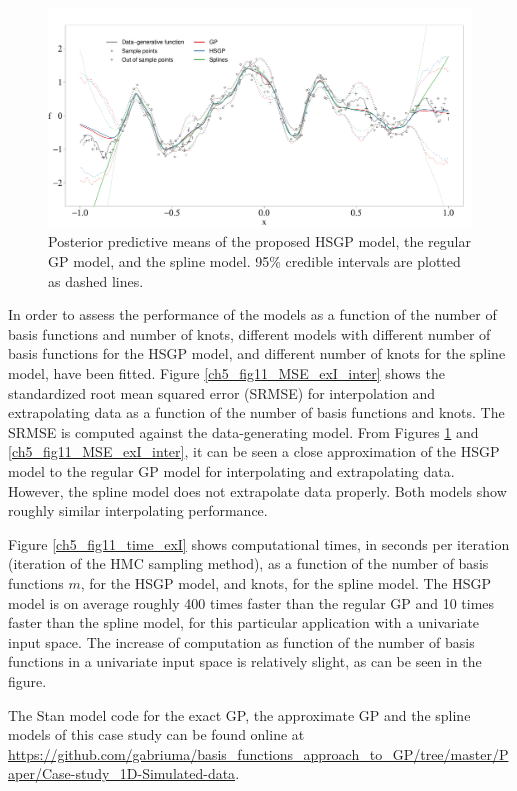 \documentclass[onecolumn,a4paper,11pt]{article}
\begin{document}
\begin{figure}
\centering
\includegraphics[width=\textwidth]{ch5_fig10_Posteriors_exI.pdf}
\caption{Posterior predictive means of the proposed HSGP model, the regular GP model, and the spline model. 95\% credible intervals are plotted as dashed lines.}
  \label{ch5_fig10_Posteriors_exI}
\end{figure}

In order to assess the performance of the models as a function of the number of basis functions and number of knots, different models with different number of basis functions for the HSGP model, and different number of knots for the spline model, have been fitted. Figure \ref{ch5_fig11_MSE_exI_inter} shows the standardized root mean squared error (SRMSE) for interpolation and extrapolating data as a function of the number of basis functions and knots. The SRMSE is computed against the data-generating model. From Figures \ref{ch5_fig10_Posteriors_exI} and \ref{ch5_fig11_MSE_exI_inter}, it can be seen a close approximation of the HSGP model to the regular GP model for interpolating and extrapolating data. However, the spline model does not extrapolate data properly. Both models show roughly similar interpolating performance. 

Figure \ref{ch5_fig11_time_exI} shows computational times, in seconds per iteration (iteration of the HMC sampling method), as a function of the number of basis functions $m$, for the HSGP model, and knots, for the spline model. {\color{blue}The HSGP model is on average roughly 400 times faster than the regular GP and 10 times faster than the spline model, for this particular application with a univariate input space. The increase of computation as function of the number of basis functions in a univariate input space is relatively slight, as can be seen in the figure.}

The Stan model code for the exact GP, the approximate GP and the spline models of this case study can be found online at {\small \url{ https://github.com/gabriuma/basis_functions_approach_to_GP/tree/master/Paper/Case-study_1D-Simulated-data}}.
%
\end{document}
